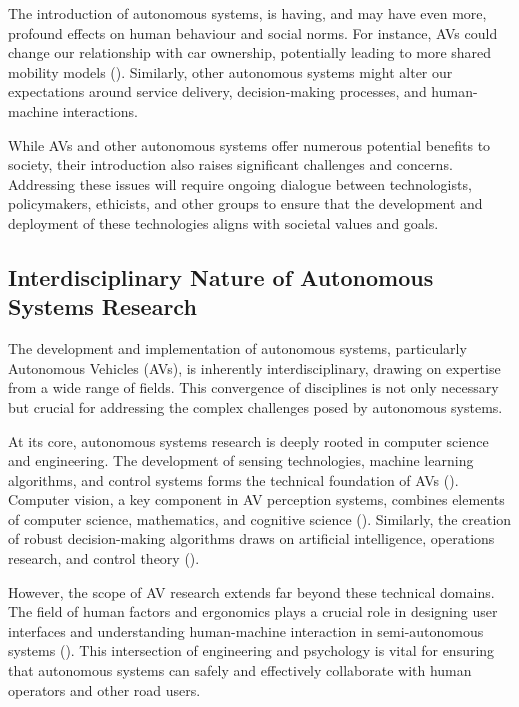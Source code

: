 The introduction of autonomous systems, is having, and may have even more, profound effects on human behaviour and social norms. For instance, AVs could change our relationship with car ownership, potentially leading to more shared mobility models (\cite{Fagnant2015}). Similarly, other autonomous systems might alter our expectations around service delivery, decision-making processes, and human-machine interactions.

While AVs and other autonomous systems offer numerous potential benefits to society, their introduction also raises significant challenges and concerns. Addressing these issues will require ongoing dialogue between technologists, policymakers, ethicists, and other groups to ensure that the development and deployment of these technologies aligns with societal values and goals.


\subsection{Interdisciplinary Nature of Autonomous Systems Research}

The development and implementation of autonomous systems, particularly Autonomous Vehicles (AVs), is inherently interdisciplinary, drawing on expertise from a wide range of fields. This convergence of disciplines is not only necessary but crucial for addressing the complex challenges posed by autonomous systems.

At its core, autonomous systems research is deeply rooted in computer science and engineering. The development of sensing technologies, machine learning algorithms, and control systems forms the technical foundation of AVs (\cite{Yurtsever2020}). Computer vision, a key component in AV perception systems, combines elements of computer science, mathematics, and cognitive science (\cite{Grigorescu2020}). Similarly, the creation of robust decision-making algorithms draws on artificial intelligence, operations research, and control theory (\cite{Kiran2021}).

However, the scope of AV research extends far beyond these technical domains. The field of human factors and ergonomics plays a crucial role in designing user interfaces and understanding human-machine interaction in semi-autonomous systems (\cite{Endsley2017}). This intersection of engineering and psychology is vital for ensuring that autonomous systems can safely and effectively collaborate with human operators and other road users.

